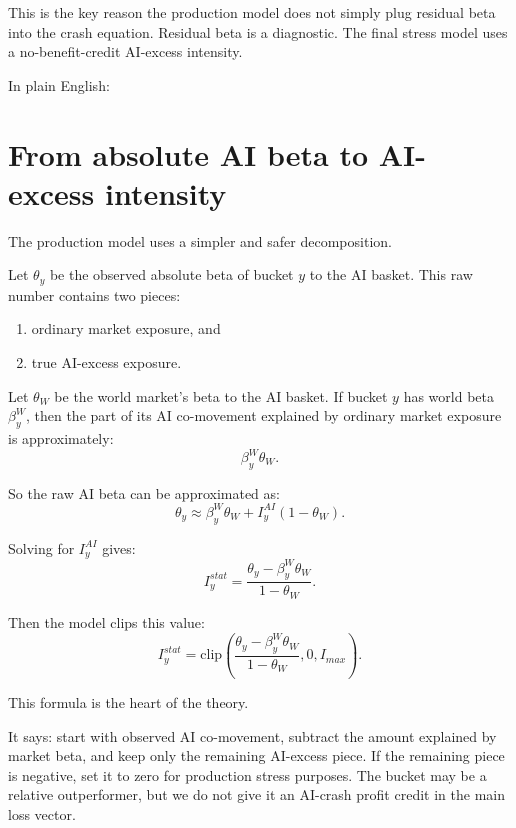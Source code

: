 \documentclass[10pt]{article}
\begin{document}
This is the key reason the production model does not simply plug residual beta into the crash equation. Residual beta is a diagnostic. The final stress model uses a no-benefit-credit AI-excess intensity.

In plain English:

\begin{center}
\end{center}

\section{From absolute AI beta to AI-excess intensity}

The production model uses a simpler and safer decomposition.

Let $\theta_y$ be the observed absolute beta of bucket $y$ to the AI basket. This raw number contains two pieces:

\begin{enumerate}
\item ordinary market exposure, and
\item true AI-excess exposure.
\end{enumerate}

Let $\theta_W$ be the world market's beta to the AI basket. If bucket $y$ has world beta $\beta_y^W$, then the part of its AI co-movement explained by ordinary market exposure is approximately:
\[
\beta_y^W\theta_W.
\]

So the raw AI beta can be approximated as:
\[
\theta_y \approx \beta_y^W\theta_W+I_y^{AI}(1-\theta_W).
\]

Solving for $I_y^{AI}$ gives:
\[
I_y^{stat}=\frac{\theta_y-\beta_y^W\theta_W}{1-\theta_W}.
\]

Then the model clips this value:
\[
I_y^{stat}=\mbox{clip}\left(\frac{\theta_y-\beta_y^W\theta_W}{1-\theta_W},0,I_{max}\right).
\]

This formula is the heart of the theory.

It says: start with observed AI co-movement, subtract the amount explained by market beta, and keep only the remaining AI-excess piece. If the remaining piece is negative, set it to zero for production stress purposes. The bucket may be a relative outperformer, but we do not give it an AI-crash profit credit in the main loss vector.
\end{document}
